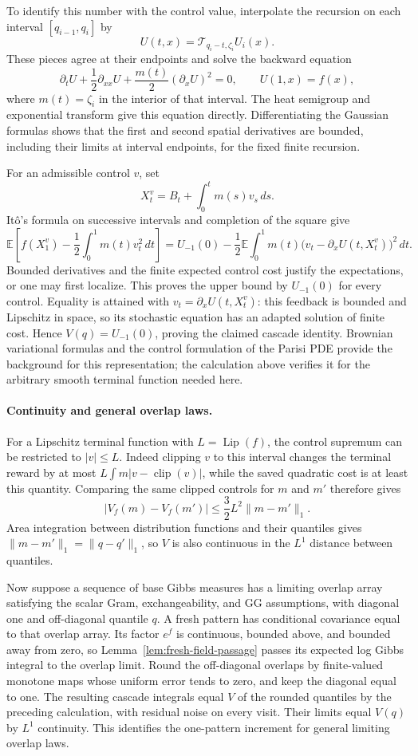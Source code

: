 \documentclass[11pt]{article}
\newcommand{\E}{\mathbb E}
\DeclareMathOperator{\Lip}{Lip}
\begin{document}
To identify this number with the control value, interpolate the recursion on each interval $[q_{i-1},q_i]$ by
\[
 U(t,x)=\mathcal T_{q_i-t,\zeta_i}U_i(x).
\]
These pieces agree at their endpoints and solve the backward equation
\[
 \partial_tU+\frac12\partial_{xx}U
       +\frac{m(t)}2(\partial_xU)^2=0,
 \qquad U(1,x)=f(x),
\]
where $m(t)=\zeta_i$ in the interior of that interval. The heat semigroup and exponential transform give this equation directly. Differentiating the Gaussian formulas shows that the first and second spatial derivatives are bounded, including their limits at interval endpoints, for the fixed finite recursion.

For an admissible control $v$, set
\[
 X_t^v=B_t+\int_0^t m(s)v_s\,ds.
\]
It\^o's formula on successive intervals and completion of the square give
\[
 \E\left[f(X_1^v)-\frac12\int_0^1m(t)v_t^2\,dt\right]
 =U_{-1}(0)-\frac12\E\int_0^1m(t)
       \bigl(v_t-\partial_xU(t,X_t^v)\bigr)^2\,dt.
\]
Bounded derivatives and the finite expected control cost justify the expectations, or one may first localize. This proves the upper bound by $U_{-1}(0)$ for every control. Equality is attained with $v_t=\partial_xU(t,X_t^v)$: this feedback is bounded and Lipschitz in space, so its stochastic equation has an adapted solution of finite cost. Hence $V(q)=U_{-1}(0)$, proving the claimed cascade identity. Brownian variational formulas \cite[Theorem~3.1]{BoueDupuis1998} and the control formulation of the Parisi PDE \cite[Theorem~3]{AuffingerChen2015} provide the background for this representation; the calculation above verifies it for the arbitrary smooth terminal function needed here.

\paragraph{Continuity and general overlap laws.}
For a Lipschitz terminal function with $L=\Lip(f)$, the control supremum can be restricted to $|v|\le L$. Indeed clipping $v$ to this interval changes the terminal reward by at most $L\int m|v-\operatorname{clip}(v)|$, while the saved quadratic cost is at least this quantity. Comparing the same clipped controls for $m$ and $m'$ therefore gives
\[
 |V_f(m)-V_f(m')|\le\frac32 L^2\|m-m'\|_1.
\]
Area integration between distribution functions and their quantiles gives
$\|m-m'\|_1=\|q-q'\|_1$, so $V$ is also continuous in the $L^1$ distance between quantiles.

Now suppose a sequence of base Gibbs measures has a limiting overlap array satisfying the scalar Gram, exchangeability, and GG assumptions, with diagonal one and off-diagonal quantile $q$. A fresh pattern has conditional covariance equal to that overlap array. Its factor $e^f$ is continuous, bounded above, and bounded away from zero, so Lemma~\ref{lem:fresh-field-passage} passes its expected log Gibbs integral to the overlap limit. Round the off-diagonal overlaps by finite-valued monotone maps whose uniform error tends to zero, and keep the diagonal equal to one. The resulting cascade integrals equal $V$ of the rounded quantiles by the preceding calculation, with residual noise on every visit. Their limits equal $V(q)$ by $L^1$ continuity. This identifies the one-pattern increment for general limiting overlap laws.
\end{document}
